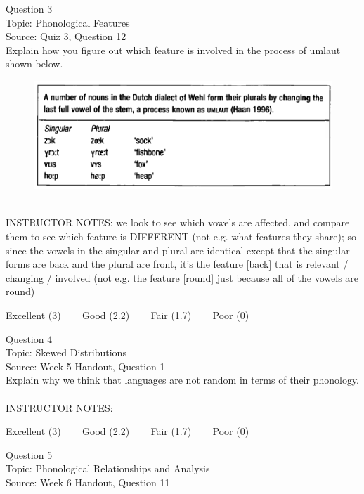 \documentclass[12pt]{article}
\begin{document}
{\large Question 3}\\

Topic: Phonological Features\\
Source: Quiz 3, Question 12\\

Explain how you figure out which feature is involved in the process of umlaut shown below.\\

\begin{figure}[H]
\includegraphics{../images/dutch.png}
\end{figure}

~\\
INSTRUCTOR NOTES: we look to see which vowels are affected, and compare them to see which feature is DIFFERENT (not e.g. what features they share); so since the vowels in the singular and plural are identical except that the singular forms are back and the plural are front, it's the feature [back] that is relevant / changing / involved (not e.g. the feature [round] just because all of the vowels are round)


\vfill
Excellent (3) ~~~ Good (2.2) ~~~ Fair (1.7) ~~~ Poor (0)
\newpage

{\large Question 4}\\

Topic: Skewed Distributions\\
Source: Week 5 Handout, Question 1\\

Explain why we think that languages are not random in terms of their phonology.\\


~\\
INSTRUCTOR NOTES: 


\vfill
Excellent (3) ~~~ Good (2.2) ~~~ Fair (1.7) ~~~ Poor (0)
\newpage

{\large Question 5}\\

Topic: Phonological Relationships and Analysis\\
Source: Week 6 Handout, Question 11\\
\end{document}
